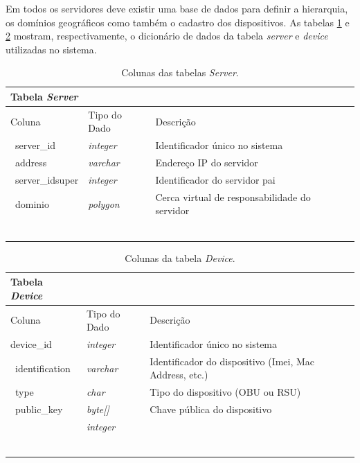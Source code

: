\documentclass[
	12pt,				%
	oneside,			%
	a4paper,			%
	english,			%
	brazil				%
	]{abntex2ppgsi}
\begin{document}
Em todos os servidores deve existir uma base de dados para definir a hierarquia, os domínios geográficos como também o cadastro dos dispositivos. As tabelas \ref{tab:serverTable} e \ref{tab:deviceTable} mostram, respectivamente, o dicionário de dados da tabela \textit{server} e \textit{device} utilizadas no sistema.

\begin{longtable}{ p{}  p{}   p{}  p{}} 
	\hline
	\rowcolor[gray]{0.7}
	Tabela \textit{Server}	& 	&  \\ \hline
	\rowcolor[gray]{0.7}
	Coluna	& Tipo do Dado	& Descrição \\ \
	server\_id	& \textit{integer} & Identificador único no sistema 	\\ \
	address	& \textit{varchar}	& Endereço IP do servidor \\ \
	server\_idsuper	& \textit{integer} & Identificador do servidor pai 	\\ \	
	dominio	& \textit{polygon} & Cerca virtual de responsabilidade do servidor	\\ \	\\ \hline
	\caption{Colunas das tabelas \textit{Server}. } %
	\label{tab:serverTable}
\end{longtable}

\newpage

\begin{longtable}{ p{}  p{}   p{}  p{}} 
	\hline
	\rowcolor[gray]{0.7}
	Tabela \textit{Device}	& 	&  \\ \hline
	\rowcolor[gray]{0.7}	
	Coluna	& Tipo do Dado	& Descrição \\ \hline
	device\_id	& \textit{integer} & Identificador único no sistema	\\ \
    identification	& \textit{varchar} & Identificador do dispositivo (Imei, Mac Address, etc.)	\\ \
    type	& \textit{char} & Tipo do dispositivo (OBU ou RSU)	\\ \
    public\_key	& \textit{byte[]} &  Chave pública do dispositivo	\\ \
		& \textit{integer} & 	\\ \	\\ \hline
	\caption{Colunas da tabela \textit{Device}. } %
	\label{tab:deviceTable}
\end{longtable}
\end{document}
